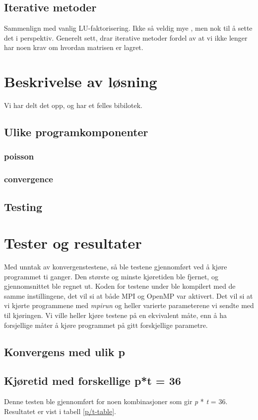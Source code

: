 \documentclass{article}
\begin{document}
\subsection{Iterative metoder}
Sammenlign med vanlig LU-faktorisering. Ikke så veldig mye , men nok til å sette det i perspektiv.
Generelt sett, drar iterative metoder fordel av at vi ikke lenger har noen krav om hvordan matrisen er lagret.

\section{Beskrivelse av løsning}
Vi har delt det opp, og har et felles bibilotek.

\subsection{Ulike programkomponenter}
\subsubsection{poisson}
\subsubsection{convergence}

\subsection{Testing}

\section{Tester og resultater}
Med unntak av konvergenstestene, så ble testene gjennomført ved å kjøre programmet ti ganger. Den største og minste kjøretiden ble fjernet, og gjennomsnittet ble regnet ut. Koden for testene under ble kompilert med de samme instillingene, det vil si at både MPI og OpenMP var aktivert. 
Det vil si at vi kjørte programmene med \emph{mpirun} og heller varierte parameterene vi sendte med til kjøringen. Vi ville heller kjøre testene på en ekvivalent måte, enn å ha forsjellige måter å kjøre programmet på gitt forskjellige parametre. 

\subsection{Konvergens med ulik p}

\subsection{Kjøretid med forskellige p*t = 36}
Denne testen ble gjennomført for noen kombinasjoner som gir \emph{p} * \emph{t} = 36. Resultatet er vist i tabell \ref{p/t-table}.
\end{document}

